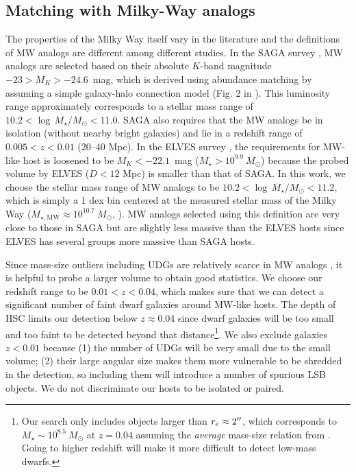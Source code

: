 \documentclass[twocolumn,astrosymb,twocolappendix]{aastex631}
\begin{document}
\begin{CJK*}{UTF8}{gbsn}
\subsection{Matching with Milky-Way analogs}\label{sec:match}
The properties of the Milky Way itself vary in the literature \citep{Licquia2015,Bland-Hawthorn2016} and the definitions of MW analogs are different among different studies. In the SAGA survey \citep{SAGA-I,SAGA-II}, MW analogs are selected based on their absolute $K$-band magnitude $-23 > M_K > -24.6$~mag, which is derived using abundance matching by assuming a simple galaxy-halo connection model (Fig. 2 in \citealt{SAGA-I}). This luminosity range approximately corresponds to a stellar mass range of $10.2 < \log\, M_\star/M_\odot < 11.0$. SAGA also requires that the MW analogs be in isolation (without nearby bright galaxies) and lie in a redshift range of $0.005 < z < 0.01$ (20--40 Mpc). In the ELVES survey \citep{ELVES-I,ELVES-II,CarlstenELVES2022}, the requirements for MW-like host is loosened to be $M_K < -22.1$~mag ($M_\star > 10^{9.9}\ M_\odot$) because the probed volume by ELVES ($D<12$ Mpc) is smaller than that of SAGA. In this work, we choose the stellar mass range of MW analogs to be $10.2 < \log\, M_\star/M_\odot < 11.2$, which is simply a 1 dex bin centered at the measured stellar mass of the Milky Way ($M_{\star, \mathrm{MW}}\approx 10^{10.7}\ M_\odot$, \citealt{Licquia2015}). MW analogs selected using this definition are very close to those in SAGA but are slightly less massive than the ELVES hosts since ELVES has several groups more massive than SAGA hosts.

Since mass-size outliers including UDGs are relatively scarce in MW analogs \citep{SAGA-II,CarlstenELVES2022}, it is helpful to probe a larger volume to obtain good statistics. We choose our redshift range to be $0.01 < z < 0.04$, which makes sure that we can detect a significant number of faint dwarf galaxies around MW-like hosts. The depth of HSC limits our detection below $z \approx 0.04$ since dwarf galaxies will be too small and too faint to be detected beyond that distance\footnote{Our search only includes objects larger than $r_e\approx 2\mbox{$^{\prime\prime}$}$, which corresponds to $M_\star \sim 10^{8.5}\ M_\odot$ at $z=0.04$ assuming the \textit{average} mass-size relation from \citet{ELVES-I}. Going to higher redshift will make it more difficult to detect low-mass dwarfs.}. We also exclude galaxies $z<0.01$ because (1) the number of UDGs will be very small due to the small volume; (2) their large angular size makes them more vulnerable to be shredded in the detection, so including them will introduce a number of spurious LSB objects. We do not discriminate our hosts to be isolated or paired.


\end{CJK*}
\end{document}
